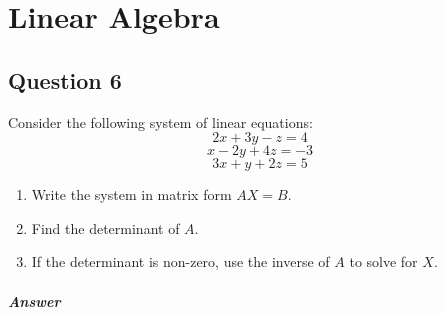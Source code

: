 \documentclass{article}
\begin{document}
\section{Linear Algebra}
\subsection{Question 6}
Consider the following system of linear equations:
$$2x + 3y - z = 4$$
$$x - 2y + 4z = -3$$
$$3x + y + 2z = 5$$
\begin{enumerate}
    \item Write the system in matrix form $ AX = B $.
    \item Find the determinant of $ A $.
    \item If the determinant is non-zero, use the inverse of $ A $ to solve for $ X $.
\end{enumerate}
\subparagraph{Answer}
\end{document}
